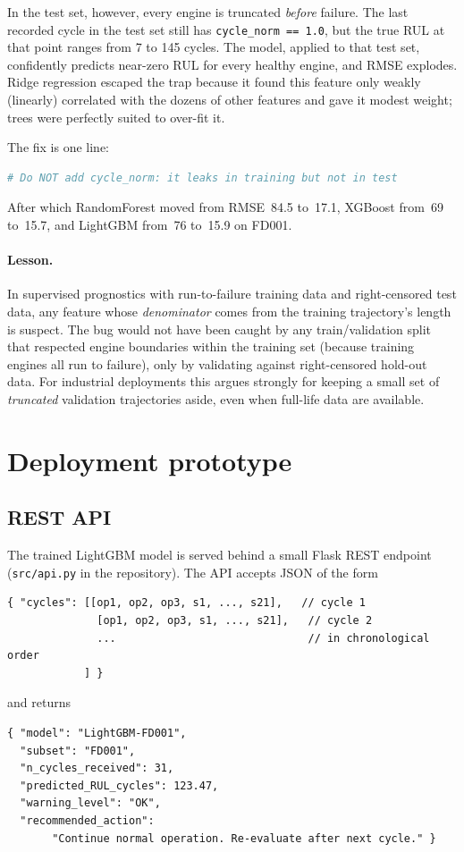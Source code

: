 \documentclass[11pt,letterpaper]{article}
\begin{document}
In the test set, however, every engine is truncated \emph{before}
failure. The last recorded cycle in the test set still has
\verb|cycle_norm == 1.0|, but the true RUL at that point ranges from
7 to 145 cycles. The model, applied to that test set, confidently
predicts near-zero RUL for every healthy engine, and RMSE explodes.
Ridge regression escaped the trap because it found this feature only
weakly (linearly) correlated with the dozens of other features and gave
it modest weight; trees were perfectly suited to over-fit it.

The fix is one line:
\begin{lstlisting}[language=Python]
# Do NOT add cycle_norm: it leaks in training but not in test
\end{lstlisting}
After which RandomForest moved from RMSE~84.5 to~17.1, XGBoost from~69
to~15.7, and LightGBM from~76 to~15.9 on FD001.

\paragraph{Lesson.} In supervised prognostics with run-to-failure
training data and right-censored test data, any feature whose
\emph{denominator} comes from the training trajectory's length is
suspect. The bug would not have been caught by any train/validation
split that respected engine boundaries within the training set (because
training engines all run to failure), only by validating against
right-censored hold-out data. For industrial deployments this argues
strongly for keeping a small set of \emph{truncated} validation
trajectories aside, even when full-life data are available.

\section{Deployment prototype}\label{sec:deployment}
\subsection{REST API}
The trained LightGBM model is served behind a small Flask
\citep{ronacher2010flask} REST endpoint
(\verb|src/api.py| in the repository). The API accepts JSON of the form
\begin{lstlisting}[language={}]
{ "cycles": [[op1, op2, op3, s1, ..., s21],   // cycle 1
              [op1, op2, op3, s1, ..., s21],   // cycle 2
              ...                              // in chronological order
            ] }
\end{lstlisting}
and returns
\begin{lstlisting}[language={}]
{ "model": "LightGBM-FD001",
  "subset": "FD001",
  "n_cycles_received": 31,
  "predicted_RUL_cycles": 123.47,
  "warning_level": "OK",
  "recommended_action":
       "Continue normal operation. Re-evaluate after next cycle." }
\end{lstlisting}
\end{document}
